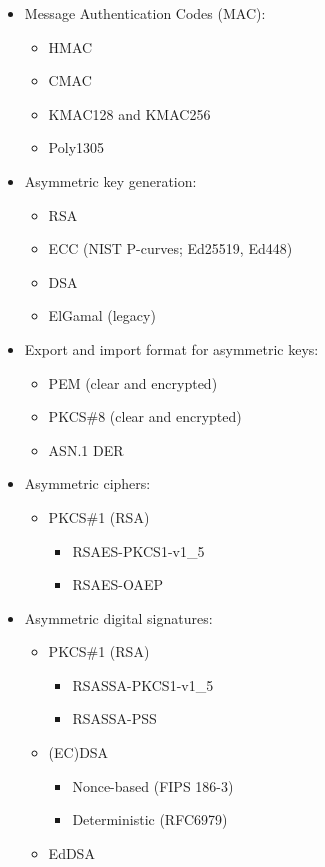\documentclass{article}
\begin{document}
\begin{itemize}
\item Message Authentication Codes (MAC):
\begin{itemize}
\item HMAC
\item CMAC
\item KMAC128 and KMAC256
\item Poly1305
\end{itemize}

\item Asymmetric key generation:
\begin{itemize}
\item RSA
\item ECC (NIST P-curves; Ed25519, Ed448)
\item DSA
\item ElGamal (legacy)
\end{itemize}

\item Export and import format for asymmetric keys:
\begin{itemize}
\item PEM (clear and encrypted)
\item PKCS\#8 (clear and encrypted)
\item ASN.1 DER
\end{itemize}

\item Asymmetric ciphers:
\begin{itemize}
    \item PKCS\#1 (RSA)
    \begin{itemize}
        \item RSAES-PKCS1-v1\_5
        \item RSAES-OAEP
    \end{itemize}
\end{itemize}

\item Asymmetric digital signatures:
\begin{itemize}
    \item PKCS\#1 (RSA)
    \begin{itemize}
        \item RSASSA-PKCS1-v1\_5
        \item RSASSA-PSS
    \end{itemize}
    \item (EC)DSA
    \begin{itemize}
        \item Nonce-based (FIPS 186-3)
        \item Deterministic (RFC6979) 
    \end{itemize}
    \item EdDSA
\end{itemize}


\end{itemize}
\end{document}
